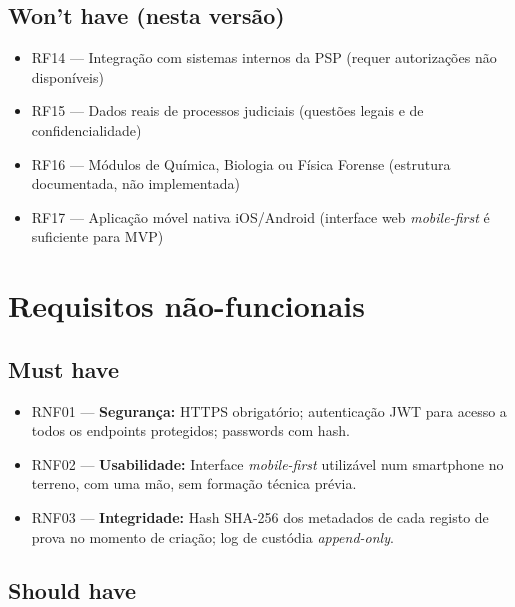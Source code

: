 \documentclass[a4paper,11pt]{article}
\begin{document}
\subsection*{Won't have (nesta versão)}

\begin{itemize}[nosep, leftmargin=*]
    \item RF14 --- Integração com sistemas internos da PSP
                   (requer autorizações não disponíveis)
    \item RF15 --- Dados reais de processos judiciais
                   (questões legais e de confidencialidade)
    \item RF16 --- Módulos de Química, Biologia ou Física Forense
                   (estrutura documentada, não implementada)
    \item RF17 --- Aplicação móvel nativa iOS/Android
                   (interface web \emph{mobile-first} é suficiente para MVP)
\end{itemize}

\section{Requisitos não-funcionais}

\subsection*{Must have}

\begin{itemize}[nosep, leftmargin=*]
    \item RNF01 --- \textbf{Segurança:} HTTPS obrigatório; autenticação JWT para
          acesso a todos os endpoints protegidos; passwords com hash.
    \item RNF02 --- \textbf{Usabilidade:} Interface \emph{mobile-first} utilizável
          num smartphone no terreno, com uma mão, sem formação técnica prévia.
    \item RNF03 --- \textbf{Integridade:} Hash SHA-256 dos metadados de cada registo
          de prova no momento de criação; log de custódia \emph{append-only}.
\end{itemize}

\subsection*{Should have}
\end{document}

